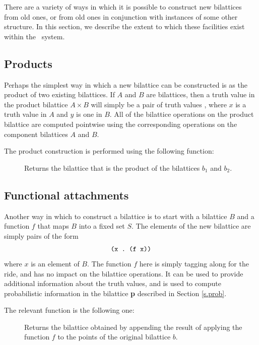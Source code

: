 There are a variety of ways in which it is possible to construct
new bilattices from old ones, or from old ones in conjunction
with instances of some other structure.  In this section, we
describe the extent to which these facilities exist within the
\mvl\ system.

\subsection{Products}
\label{s.product}

Perhaps the simplest way in which a new bilattice can be constructed
is as the product of two existing bilattices.  If $A$ and $B$ are
bilattices, then a truth value in the product bilattice $A\times B$
will simply be a pair of truth values , where $x$ is a
truth value in $A$ and $y$ is one in $B$.  All of the bilattice
operations on the product bilattice are computed pointwise using the
corresponding operations on the component bilattices $A$ and $B$.

The product construction is performed using the following function:
 \begin{description}
 \item [] Returns the bilattice
that is the product of the bilattices $b_1$ and $b_2$.
 \end{description}

\subsection{Functional attachments}

Another way in which to construct a bilattice is to start with a
bilattice $B$ and a function $f$ that maps $B$ into a fixed set $S$.
The elements of the new bilattice are simply pairs of the form
 \[\mbox{\tt (x .~(f x))}\]
 where $x$ is an element of $B$.  The function $f$ here is simply
tagging along for the ride, and has no impact on the bilattice
operations.  It can be used to provide additional information about
the truth values, and is used to compute probabilistic information in
the bilattice {\bf p} described in Section \ref{s.prob}.

The relevant function is the following one:
 \begin{description}
 \item [] Returns the bilattice obtained
by appending the result of applying the function $f$ to the points of
the original bilattice $b$.
 \end{description}

